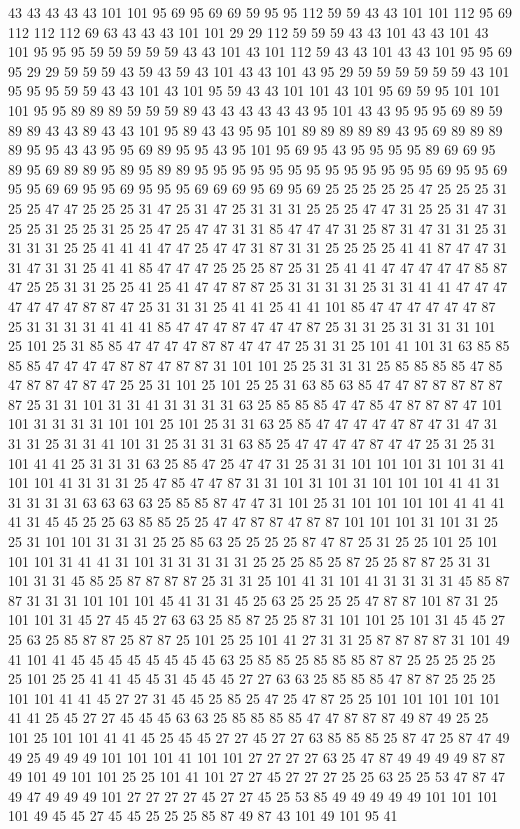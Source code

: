 43 43 43 43 43 101 101 95 69 95 69 69 59 95 95 112 59 59 43 43 101 101 112 95 69 112 112 112 69 63 43 43 43 101 101 29 29 112 59 59 59 43 43 101 43 43 101 43 101 95 95 95 59 59 59 59 59 43 43 101 43 101 112 59 43 43 101 43 43 101 95 95 69 95 29 29 59 59 59 43 59 43 59 43 101 43 43 101 43 95 29 59 59 59 59 59 59 43 101 95 95 95 59 59 43 43 101 43 101 95 59 43 43 101 101 43 101 95 69 59 95 101 101 101 95 95 89 89 89 59 59 59 89 43 43 43 43 43 43 95 101 43 43 95 95 95 69 89 59 89 89 43 43 89 43 43 101 95 89 43 43 95 95 101 89 89 89 89 89 43 95 69 89 89 89 89 95 95 43 43 95 95 69 89 95 95 43 95 101 95 69 95 43 95 95 95 95 89 69 69 95 89 95 69 89 89 95 89 95 89 89 95 95 95 95 95 95 95 95 95 95 95 95 95 69 95 95 69 95 95 69 69 95 95 69 95 95 95 69 69 69 95 69 95 69 25 25 25 25 25 47 25 25 25 31 25 25 47 47 25 25 25 31 47 25 31 47 25 31 31 31 25 25 25 47 47 31 25 25 31 47 31 25 25 31 25 25 31 25 25 47 25 47 47 31 31 85 47 47 47 31 25 87 31 47 31 31 25 31 31 31 31 25 25 41 41 41 47 47 25 47 47 31 87 31 31 25 25 25 25 41 41 87 47 47 31 31 47 31 31 25 41 41 85 47 47 47 25 25 25 87 25 31 25 41 41 47 47 47 47 47 85 87 47 25 25 31 31 25 25 41 25 41 47 47 87 87 25 31 31 31 31 25 31 31 41 41 47 47 47 47 47 47 47 87 87 47 25 31 31 31 25 41 41 25 41 41 101 85 47 47 47 47 47 47 87 25 31 31 31 31 41 41 41 85 47 47 47 87 47 47 47 87 25 31 31 25 31 31 31 31 101 25 101 25 31 85 85 47 47 47 47 87 87 47 47 47 25 31 31 25 101 41 101 31 63 85 85 85 85 47 47 47 47 87 87 47 87 87 31 101 101 25 25 31 31 31 25 85 85 85 85 47 85 47 87 87 47 87 47 25 25 31 101 25 101 25 25 31 63 85 63 85 47 47 87 87 87 87 87 87 25 31 31 101 31 31 41 31 31 31 31 63 25 85 85 85 47 47 85 47 87 87 87 47 101 101 31 31 31 31 101 101 25 101 25 31 31 63 25 85 47 47 47 47 47 87 47 31 47 31 31 31 25 31 31 41 101 31 25 31 31 31 63 85 25 47 47 47 47 87 47 47 25 31 25 31 101 41 41 25 31 31 31 63 25 85 47 25 47 47 31 25 31 31 101 101 101 31 101 31 41 101 101 41 31 31 31 25 47 85 47 47 87 31 31 101 31 101 31 101 101 101 41 41 31 31 31 31 31 63 63 63 63 25 85 85 87 47 47 31 101 25 31 101 101 101 101 41 41 41 41 31 45 45 25 25 63 85 85 25 25 47 47 87 87 47 87 87 101 101 101 31 101 31 25 25 31 101 101 31 31 31 25 25 85 63 25 25 25 25 87 47 87 25 31 25 25 101 25 101 101 101 31 41 41 31 101 31 31 31 31 31 25 25 25 85 25 87 25 25 87 87 25 31 31 101 31 31 45 85 25 87 87 87 87 25 31 31 25 101 41 31 101 41 31 31 31 31 45 85 87 87 31 31 31 101 101 101 45 41 31 31 45 25 63 25 25 25 25 47 87 87 101 87 31 25 101 101 31 45 27 45 45 27 63 63 25 85 87 25 25 87 31 101 101 25 101 31 45 45 27 25 63 25 85 87 87 25 87 87 25 101 25 25 101 41 27 31 31 25 87 87 87 87 31 101 49 41 101 41 45 45 45 45 45 45 45 45 63 25 85 85 25 85 85 85 87 87 25 25 25 25 25 25 101 25 25 41 41 45 45 31 45 45 45 27 27 63 63 25 85 85 85 47 87 87 25 25 25 101 101 41 41 45 27 27 31 45 45 25 85 25 47 25 47 87 25 25 101 101 101 101 101 41 41 25 45 27 27 45 45 45 63 63 25 85 85 85 85 47 47 87 87 87 49 87 49 25 25 101 25 101 101 41 41 45 25 45 45 27 27 45 27 27 63 85 85 85 25 87 47 25 87 47 49 49 25 49 49 49 101 101 101 41 101 101 27 27 27 27 63 25 47 87 49 49 49 49 87 87 49 101 49 101 101 25 25 101 41 101 27 27 45 27 27 27 25 25 63 25 25 53 47 87 47 49 47 49 49 49 101 27 27 27 27 45 27 27 45 25 53 85 49 49 49 49 49 101 101 101 101 49 45 45 27 45 45 25 25 25 85 87 49 87 43 101 49 101 95 41 